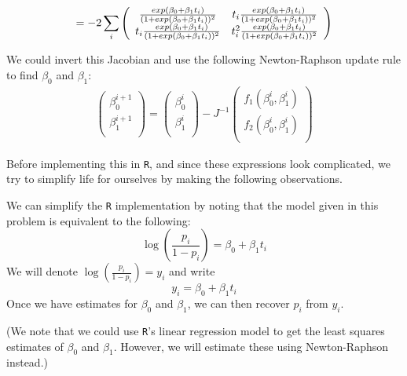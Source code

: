 \documentclass[12pt]{article}
\begin{document}
\begin{enumerate}[(a)]
 \begin{align*}
 = -2 \sum_i
\left( {\begin{array}{*{20}c}
\frac{exp(\beta_0 + \beta_1 t_i) } { (1 + exp(\beta_0 + \beta_1 t_i))^2 } & t_i \frac{exp(\beta_0 + \beta_1 t_i) } { (1 + exp(\beta_0 + \beta_1 t_i))^2 }\\
t_i \frac{exp(\beta_0 + \beta_1 t_i) } { (1 + exp(\beta_0 + \beta_1 t_i))^2 } & t_i^2 \frac{exp(\beta_0 + \beta_1 t_i) } { (1 + exp(\beta_0 + \beta_1 t_i))^2 }\\
 \end{array} } \right)
\end{align*}



We could invert this Jacobian and use the following Newton-Raphson update rule to find $\beta_0$ and $\beta_1$:
\begin{align*}
\left(
\begin{array}{c} 
   \beta_0^{i+1} \\
   \beta_1^{i+1}\\ 
\end{array}
\right)
=
\left(
\begin{array}{c} 
   \beta_0^{i} \\
   \beta_1^{i}\\ 
\end{array}
\right)
- J^{-1} 
\left(
\begin{array}{c} 
   f_1(\beta_0^{i}, \beta_1^{i} ) \\
   f_2(\beta_0^{i}, \beta_1^{i} ) \\
\end{array}
\right)
\end{align*} 

\bigskip
\bigskip
Before implementing this in \texttt{R}, and since these expressions look complicated, we try to simplify life for ourselves by making the following observations.

We can simplify the \texttt{R} implementation by noting that
the model given in this problem is equivalent to the following:
$$
\log\left(\frac{p_i}{1 - p_i}\right) = \beta_0 + \beta_1 t_i
$$
We will denote $\log\left(\frac{p_i}{1 - p_i}\right) = y_i$ and write
$$
y_i = \beta_0 + \beta_1 t_i
$$
Once we have estimates for  $\beta_0$ and $\beta_1$, we can then recover $p_i$ from $y_i$.

(We note that we could use \texttt{R}'s linear regression model to get the least squares estimates of $\beta_0$ and $\beta_1$. However, we will estimate these using Newton-Raphson instead.)


\end{enumerate}
\end{document}
